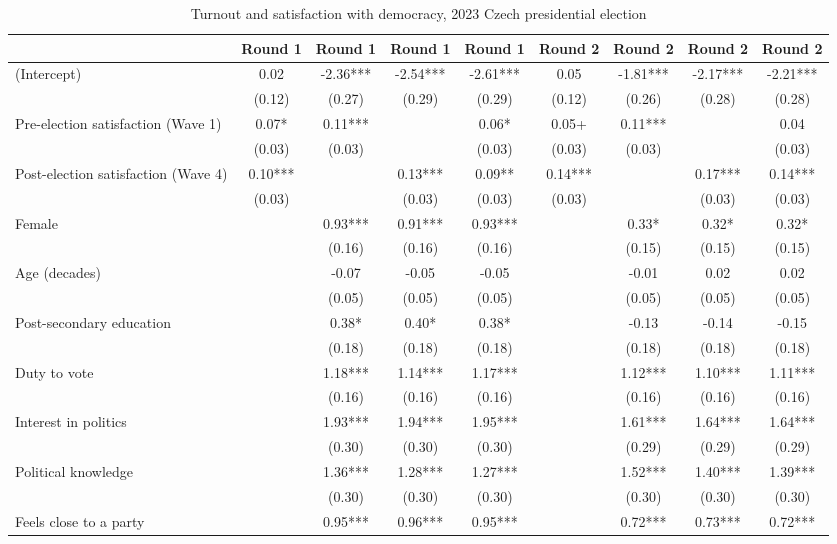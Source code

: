 \begin{table}

\caption{\label{tab:unnamed-chunk-4}Turnout and satisfaction with democracy, 2023 Czech presidential election}
\centering
\begin{tabular}[t]{lcccccccc}
\toprule
  & Round 1 & Round 1  & Round 1   & Round 1    & Round 2 & Round 2  & Round 2   & Round 2   \\
\midrule
(Intercept) & 0.02 & -2.36*** & -2.54*** & -2.61*** & 0.05 & -1.81*** & -2.17*** & -2.21***\\
 & (0.12) & (0.27) & (0.29) & (0.29) & (0.12) & (0.26) & (0.28) & (0.28)\\
Pre-election satisfaction (Wave 1) & 0.07* & 0.11*** &  & 0.06* & 0.05+ & 0.11*** &  & 0.04\\
 & (0.03) & (0.03) &  & (0.03) & (0.03) & (0.03) &  & (0.03)\\
Post-election satisfaction (Wave 4) & 0.10*** &  & 0.13*** & 0.09** & 0.14*** &  & 0.17*** & 0.14***\\
 & (0.03) &  & (0.03) & (0.03) & (0.03) &  & (0.03) & (0.03)\\
Female &  & 0.93*** & 0.91*** & 0.93*** &  & 0.33* & 0.32* & 0.32*\\
 &  & (0.16) & (0.16) & (0.16) &  & (0.15) & (0.15) & (0.15)\\
Age (decades) &  & -0.07 & -0.05 & -0.05 &  & -0.01 & 0.02 & 0.02\\
 &  & (0.05) & (0.05) & (0.05) &  & (0.05) & (0.05) & (0.05)\\
Post-secondary education &  & 0.38* & 0.40* & 0.38* &  & -0.13 & -0.14 & -0.15\\
 &  & (0.18) & (0.18) & (0.18) &  & (0.18) & (0.18) & (0.18)\\
Duty to vote &  & 1.18*** & 1.14*** & 1.17*** &  & 1.12*** & 1.10*** & 1.11***\\
 &  & (0.16) & (0.16) & (0.16) &  & (0.16) & (0.16) & (0.16)\\
Interest in politics &  & 1.93*** & 1.94*** & 1.95*** &  & 1.61*** & 1.64*** & 1.64***\\
 &  & (0.30) & (0.30) & (0.30) &  & (0.29) & (0.29) & (0.29)\\
Political knowledge &  & 1.36*** & 1.28*** & 1.27*** &  & 1.52*** & 1.40*** & 1.39***\\
 &  & (0.30) & (0.30) & (0.30) &  & (0.30) & (0.30) & (0.30)\\
Feels close to a party &  & 0.95*** & 0.96*** & 0.95*** &  & 0.72*** & 0.73*** & 0.72***\\

\end{tabular}
\end{table}
